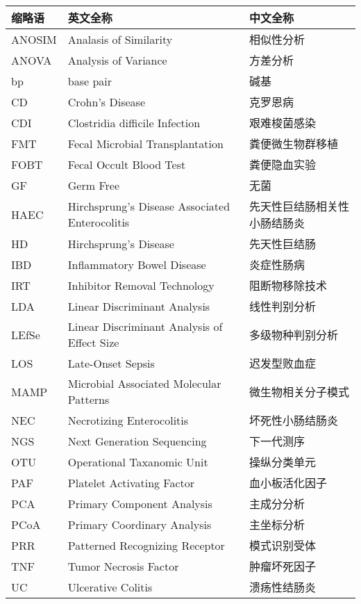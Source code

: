 \begin{nomenclaturename}
\label{chap:symb}

\begin{table}[htbp]
  \centering
 \begin{tabular}{llp{4cm}}
  \toprule
  缩略语 & 英文全称 & 中文全称 \\
  \midrule
    ANOSIM & Analasis of Similarity & 相似性分析\\
    ANOVA & Analysis of Variance & 方差分析\\
    bp & base pair & 碱基\\
    CD & Crohn’s Disease & 克罗恩病\\
    CDI &	Clostridia difficile Infection & 艰难梭菌感染\\
    FMT & Fecal Microbial Transplantation & 粪便微生物群移植\\
    FOBT & Fecal Occult Blood Test & 粪便隐血实验\\
    GF & Germ Free & 无菌\\
    HAEC & Hirchsprung’s Disease Associated Enterocolitis & 先天性巨结肠相关性小肠结肠炎\\
    HD & Hirchsprung’s Disease & 先天性巨结肠\\
    IBD & Inflammatory Bowel Disease & 炎症性肠病\\
    IRT & Inhibitor Removal Technology & 阻断物移除技术\\
    LDA & Linear Discriminant Analysis & 线性判别分析\\
    LEfSe & Linear Discriminant Analysis of Effect Size & 多级物种判别分析\\
    LOS & Late-Onset Sepsis & 迟发型败血症\\
    MAMP & Microbial Associated Molecular Patterns & 微生物相关分子模式\\
    NEC & Necrotizing Enterocolitis & 坏死性小肠结肠炎\\
    NGS & Next Generation Sequencing & 下一代测序\\
    OTU & Operational Taxanomic Unit & 操纵分类单元\\
    PAF & Platelet Activating Factor & 血小板活化因子\\
    PCA & Primary Component Analysis & 主成分分析\\
    PCoA & Primary Coordinary Analysis & 主坐标分析\\
    PRR & Patterned Recognizing Receptor & 模式识别受体\\
    TNF & Tumor Necrosis Factor & 肿瘤坏死因子\\
    UC & Ulcerative Colitis & 溃疡性结肠炎 \\
  \bottomrule
 \end{tabular}
\end{table}

\end{nomenclaturename}
